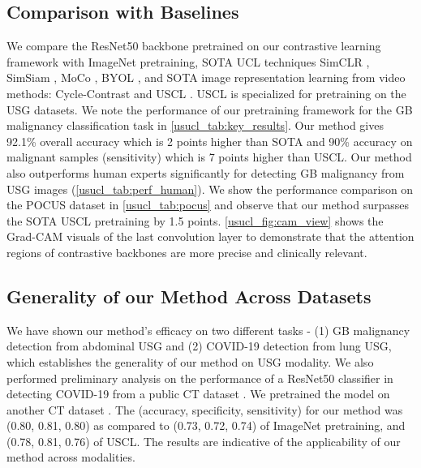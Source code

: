 \subsection{Comparison with Baselines}
%
We compare the ResNet50 \cite{resnet} backbone pretrained on our contrastive learning framework with ImageNet pretraining, SOTA UCL techniques SimCLR \cite{simclr}, SimSiam \cite{simsiam}, MoCo \cite{moco}, BYOL \cite{byol}, and SOTA image representation learning from video methods: Cycle-Contrast \cite{cyclecontrast} and USCL \cite{uscl}. USCL is specialized for pretraining on the USG datasets. We note the performance of our pretraining framework for the GB malignancy classification task in \cref{usucl_tab:key_results}. Our method gives 92.1\% overall accuracy which is 2 points higher than SOTA and 90\% accuracy on malignant samples (sensitivity) which is 7 points higher than USCL. Our method also outperforms human experts significantly for detecting GB malignancy from USG images (\cref{usucl_tab:perf_human}). We show the performance comparison on the POCUS dataset in \cref{usucl_tab:pocus} and observe that our method surpasses the SOTA USCL pretraining by 1.5 points. \cref{usucl_fig:cam_view} shows the Grad-CAM \cite{gradcam} visuals of the last convolution layer to demonstrate that the attention regions of contrastive backbones are more precise and clinically relevant.



\subsection{Generality of our Method Across Datasets} 
%
We have shown our method's efficacy on two different tasks - (1) GB malignancy detection from abdominal USG and (2) COVID-19 detection from lung USG, which establishes the generality of our method on USG modality. We also performed preliminary analysis on the performance of a ResNet50 classifier in detecting COVID-19 from a public CT dataset \cite{cov-finetune}. We pretrained the model on another CT dataset \cite{cov-pretrain}. The (accuracy, specificity, sensitivity) for our method was (0.80, 0.81, 0.80) as compared to (0.73, 0.72, 0.74) of ImageNet pretraining, and (0.78, 0.81, 0.76) of USCL. The results are indicative of the applicability of our method across modalities. 

